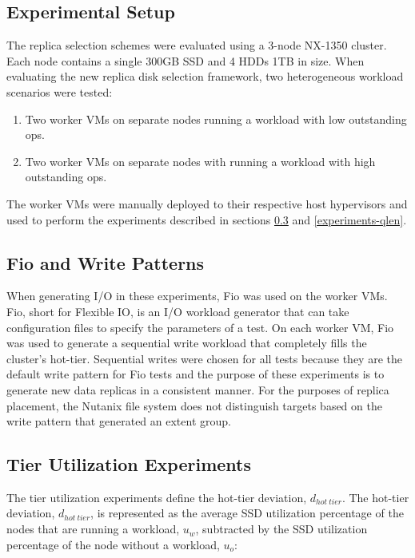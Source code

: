 \documentclass[12pt]{article}
\begin{document}
  \subsection{Experimental Setup}

  The replica selection schemes were evaluated using a 3-node NX-1350 cluster.
  Each node contains a single 300GB SSD and 4 HDDs 1TB in size. When evaluating
  the new replica disk selection framework, two heterogeneous workload
  scenarios were tested:
 
  \begin{enumerate}
    \item Two worker VMs on separate nodes running a workload with low
          outstanding ops.
    \item Two worker VMs on separate nodes with running a
          workload with high outstanding ops.
  \end{enumerate}

  The worker VMs were manually deployed to their respective host hypervisors and
  used to perform the experiments described in sections
  \ref{experiments-tier-util} and \ref{experiments-qlen}.
 
  \subsection{Fio and Write Patterns}

  When generating I/O in these experiments, Fio was used on the worker VMs. Fio,
  short for Flexible IO, is an I/O workload generator that can take
  configuration files to specify the parameters of a test. On each worker VM,
  Fio was used to generate a sequential write workload that completely fills the
  cluster's hot-tier. Sequential writes were chosen for all tests because they
  are the default write pattern for Fio tests and the purpose of these
  experiments is to generate new data replicas in a consistent manner. For the
  purposes of replica placement, the Nutanix file system does not distinguish
  targets based on the write pattern that generated an extent group.

  \subsection{Tier Utilization Experiments} \label{experiments-tier-util}

  The tier utilization experiments define the hot-tier deviation, $d_{hot\
  tier}$. The hot-tier deviation, $d_{hot\ tier}$, is represented as the
  average SSD utilization percentage of the nodes that are running a workload, $u_{w}$,
  subtracted by the SSD utilization percentage of the node without a workload,
  $u_{o}$:
  
\end{document}
